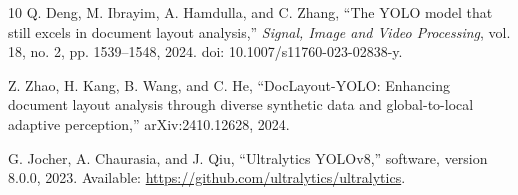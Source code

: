 \documentclass[pdflatex,sn-mathphys-num]{sn-jnl}
\begin{document}
\begin{thebibliography}{10}
Q. Deng, M. Ibrayim, A. Hamdulla, and C. Zhang, ``The YOLO model that still excels in document layout analysis,'' \emph{Signal, Image and Video Processing}, vol. 18, no. 2, pp. 1539--1548, 2024. doi: 10.1007/s11760-023-02838-y.

Z. Zhao, H. Kang, B. Wang, and C. He, ``DocLayout-YOLO: Enhancing document layout analysis through diverse synthetic data and global-to-local adaptive perception,'' arXiv:2410.12628, 2024.

G. Jocher, A. Chaurasia, and J. Qiu, ``Ultralytics YOLOv8,'' software, version 8.0.0, 2023. Available: \url{https://github.com/ultralytics/ultralytics}.

\end{thebibliography}
\end{document}

